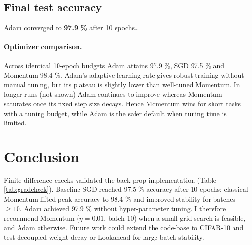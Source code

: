\documentclass[11pt]{article}
\begin{document}
\subsection{Final test accuracy}
Adam converged to \textbf{97.9 \%} after 10 epochs…\footnotemark[2]

\paragraph{Optimizer comparison.}
Across identical 10-epoch budgets Adam attains 97.9 \%, SGD 97.5 \% and
Momentum 98.4 \%.  Adam’s adaptive learning-rate gives robust training
without manual tuning, but its plateau is slightly lower than well-tuned
Momentum.  In longer runs (not shown) Adam continues to improve whereas
Momentum saturates once its fixed step size decays.  Hence Momentum wins
for short tasks with a tuning budget, while Adam is the safer default
when tuning time is limited.

\section*{Conclusion}
Finite-difference checks validated the back-prop implementation
(Table \ref{tab:gradcheck}).  Baseline SGD reached 97.5 \% accuracy
after 10 epochs; classical Momentum lifted peak accuracy to 98.4 \% and
improved stability for batches $\ge10$.  Adam achieved 97.9 \% without
hyper-parameter tuning.  I therefore recommend Momentum
($\eta=0.01$, batch 10) when a small grid-search is feasible, and Adam
otherwise.  Future work could extend the code-base to CIFAR-10 and test
decoupled weight decay or Lookahead for large-batch stability.
\end{document}
